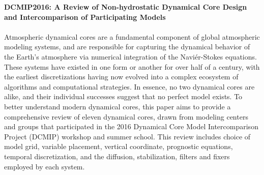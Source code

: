 \documentclass[11pt]{article}
\begin{document}
\noindent \textbf{DCMIP2016:  A Review of Non-hydrostatic Dynamical Core Design and Intercomparison of Participating Models} \\

 \\

\noindent Atmospheric dynamical cores are a fundamental component of global atmospheric modeling systems, and are responsible for capturing the dynamical behavior of the Earth's atmosphere via numerical integration of the Navi\'er-Stokes equations.  These systems have existed in one form or another for over half of a century, with the earliest discretizations having now evolved into a complex ecosystem of algorithms and computational strategies.  In essence, no two dynamical cores are alike, and their individual successes suggest that no perfect model exists.  To better understand modern dynamical cores, this paper aims to provide a comprehensive review of eleven dynamical cores, drawn from modeling centers and groups that participated in the 2016 Dynamical Core Model Intercomparison Project (DCMIP) workshop and summer school.  This review includes choice of model grid, variable placement, vertical coordinate, prognostic equations, temporal discretization, and the diffusion, stabilization, filters and fixers employed by each system.
\end{document}
